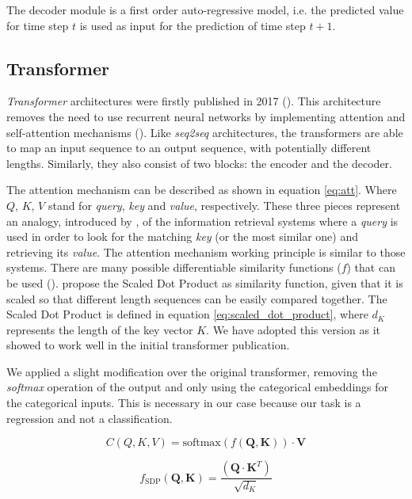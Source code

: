 The decoder module is a first order auto-regressive model, i.e. the predicted value for time step $t$ is used as input for the prediction of time step $t+1$.



\subsection{Transformer}
\textit{Transformer} architectures were firstly published  in 2017 (\cite{vaswani2017}). This architecture removes the need to use recurrent neural networks by implementing attention and self-attention mechanisms (\cite{bahdanau2015}).  Like \textit{seq2seq} architectures, the transformers are able to map an input sequence to an output sequence, with potentially different lengths. Similarly, they also consist of two blocks: the encoder and the decoder.

The attention mechanism can be described as shown in equation \ref{eq:att}. Where $Q$, $K$, $V$ stand for \textit{query}, \textit{key} and \textit{value}, respectively. These three pieces represent an analogy, introduced by \cite{vaswani2017}, of the information retrieval systems where a \textit{query} is used in order to look for the matching \textit{key} (or the most similar one) and retrieving its \textit{value}. The attention mechanism working principle is similar to those systems. There are many possible differentiable similarity functions ($f$) that can be used (\cite{kamath2019}). \cite{vaswani2017} propose the Scaled Dot Product as similarity function, given that it is scaled so that different length sequences can be easily compared together. The Scaled Dot Product is defined in equation \ref{eq:scaled_dot_product},  where $d_K$ represents the length of the key vector $K$. We have adopted this version as it showed to work well in the initial transformer publication.

We applied a slight modification over the original transformer, removing the \textit{softmax} operation of the output and only using the categorical embeddings for the categorical inputs. This is necessary in our case because our task is a regression and not a classification.

\begin{equation}
C(Q,K,V) = \text{softmax}(f(\mathbf{Q}, \mathbf{K})) \cdot \mathbf{V}
\label{eq:att}
\end{equation}

\begin{equation}
f_{\text{SDP}}(\mathbf{Q}, \mathbf{K}) = \frac{(\mathbf{Q} \cdot \mathbf{K}^T)} {\sqrt {d_K}}
\label{eq:scaled_dot_product}
\end{equation}

